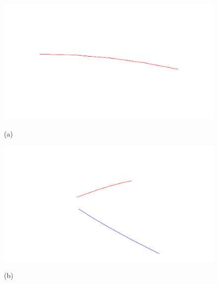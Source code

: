 \begin{figure} [ht]
   \centering
   \begin{makeimage}
   \end{makeimage}
   \begin{latexonly}
	\hspace{0.1cm}
	\begin{minipage} [c] [] [c]{3.5cm} 
	\includegraphics [width =\textwidth] {images/WireStentDemot2Step04}
	\begin{center}
	\vspace{-3ex}
	(a)
	\vspace{1ex}
	\end{center}
\end{minipage}
\hspace{0.3cm}
\begin{minipage} [c] [] [c] {3.5cm}
	\includegraphics [width =\textwidth] {images/WireStentDemot2Step07}
	\begin{center}
	\vspace{-3ex}
	(b)
	\vspace{1ex}
	\end{center}
\end{minipage}

\end{latexonly}
\end{figure}
